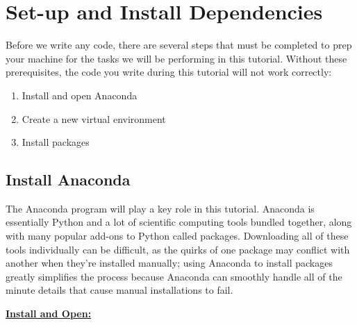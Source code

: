 \section{Set-up and Install Dependencies}
Before we write any code, there are several steps that must be completed to prep your machine for the tasks we will be performing in this tutorial. Without these prerequisites, the code you write during this tutorial will not work correctly:
\begin{enumerate}
\item Install and open Anaconda
\item Create a new virtual environment
\item Install packages
\end{enumerate}

\subsection{Install Anaconda}
The Anaconda program will play a key role in this tutorial. Anaconda is essentially Python and a lot of scientific computing tools bundled together, along with many popular add-ons to Python called packages.  Downloading all of these tools individually can be difficult, as the quirks of one package may conflict with another when they're installed manually; using Anaconda to install packages greatly simplifies the process because Anaconda can smoothly handle all of the minute details that cause manual installations to fail.

\textbf{\underline{Install and Open:}}


